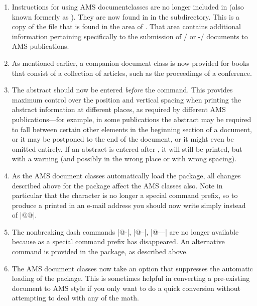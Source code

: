 \documentclass{amsdtx}
\begin{document}
\begin{enumerate}

\item Instructions for using AMS documentclasses are no longer included
in  (also known formerly as ). They are
now found in  in the  subdirectory. This is
a copy of the file  that is found in the
 area of . That area contains
additional information pertaining specifically to the submission of
\latex/ or \AmS-\tex/ documents to AMS publications.

\item As mentioned earlier, a companion document class  is
now provided for books that consist of a collection of articles, such as
the proceedings of a conference.

\item The abstract should now be entered \emph{before} the
 command. This provides maximum control over the position
and vertical spacing when printing the abstract information at different
places, as required by different AMS publications---for example, in some
publications the abstract may be required to fall between certain other
elements in the beginning section of a document, or it may be postponed
to the end of the document, or it might even be omitted entirely. If an
abstract is entered after , it will still be printed, but
with a warning (and possibly in the wrong place or with wrong spacing).

\item As the AMS document classes automatically load the 
package, all changes described above for the  package
affect the AMS classes also. Note in particular that the \qc{\@}
character is no longer a special command prefix, so to produce a printed
\qc{\@} in an e-mail address you should now write simply \qc{\@} instead
of |@@|.

\item The nonbreaking dash commands |@-|, |@--|, |@---| are no longer
available because \qc{\@} as a special command prefix has disappeared.
An alternative  command is provided in the 
package, as described above.

\item The AMS document classes now take an option  that
suppresses the automatic loading of the  package. This is
sometimes helpful in converting a pre-existing document to AMS style if
you only want to do a quick conversion without attempting to
deal with any of the math.


\end{enumerate}
\end{document}
